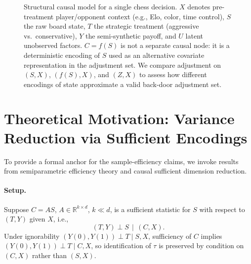 \documentclass[11pt]{article}
\begin{document}
\begin{figure}[t]
\centering
{}
\caption{Structural causal model for a single chess decision.
$X$ denotes pre-treatment player/opponent context (e.g., Elo, color, time control),
$S$ the raw board state, $T$ the strategic treatment (aggressive vs.\ conservative),
$Y$ the semi-synthetic payoff, and $U$ latent unobserved factors.
$C = f(S)$ is not a separate causal node: it is a deterministic encoding of $S$
used as an alternative covariate representation in the adjustment set.
We compare adjustment on $(S, X)$, $(f(S), X)$, and $(Z, X)$ to assess
how different encodings of state approximate a valid back-door adjustment set.}
\label{fig:scm_chess}
\end{figure}

\section*{Theoretical Motivation: Variance Reduction via Sufficient Encodings}
\label{sec:theory}

To provide a formal anchor for the sample-efficiency claims, we invoke results from
semiparametric efficiency theory and causal sufficient dimension
reduction.\cite{hahn1998role,ma2012semiparametric,nabi2022causal}

\paragraph{Setup.} Suppose $C = AS$, $A \in \mathbb{R}^{k \times d}$, $k \ll d$,
is a sufficient statistic for $S$ with respect to $(T, Y)$ given $X$, i.e.,
\[
(T, Y) \perp S \,\mid\, (C, X).
\]
Under ignorability $(Y(0), Y(1)) \perp T \mid S, X$, sufficiency of $C$ implies
$(Y(0), Y(1)) \perp T \mid C, X$, so identification of $\tau$ is preserved by
condition on $(C, X)$ rather than $(S, X)$.
\end{document}
